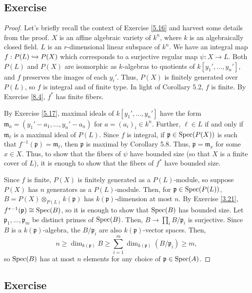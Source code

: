 \subsection{Exercise}\label{8.5}

\begin{proof}
Let's briefly recall the context of Exercise \ref{5.16} and harvest some details from the proof. $X$ is an affine algebraic variety of $k^n$, where
$k$ is an algebraically closed field. $L$ is an $r$-dimensional linear subspace of $k^n$. We have an integral map $f : P(L) \xhookrightarrow{} P(X)$
which corresponds to a surjective regular map $\psi : X \to L$. Both $P(L)$ and $P(X)$ are isomorphic as $k$-algebras to quotients of $k[y_1',\ldots,y_n']$,
and $f$ preserves the images of each $y_i'$. Thus, $P(X)$ is finitely generated over $P(L)$, so $f$ is integral and of finite type. In light of Corollary 5.2, 
$f$ is finite. By Exercise \ref{8.4}, $f^*$ has finite fibers.

By Exercise \ref{5.17}, maximal ideals of $k[y_1',\ldots,y_n']$ have the form $\mathfrak{m}_a = (y_1' - a_1,\ldots,y_n' - a_n)$ for $a = (a_i)_i \in k^n$. 
Further, $\ell \in L$ if and only if $\mathfrak{m}_{\ell}$ is a maximal ideal of $P(L)$. Since $f$ is integral, if $\mathfrak{p} \in \operatorname{Spec}(P(X))$ is such that 
$f^{-1}(\mathfrak{p}) = \mathfrak{m}_{\ell}$, then $\mathfrak{p}$ is maximal by Corollary 5.8. Thus, $\mathfrak{p} = \mathfrak{m}_x$ for some $x \in X$. Thus, 
to show that the fibers of $\psi$ have bounded size (so that $X$ is a finite cover of $L$), it is enough to show that the fibers of $f^*$ have bounded size.

Since $f$ is finite, $P(X)$ is finitely generated as a $P(L)$-module, so suppose $P(X)$ has $n$ generators as a $P(L)$-module. Then, for $\mathfrak{p} \in \operatorname{Spec}(P(L))$,
$B = P(X) \otimes_{P(L)} k(\mathfrak{p})$ has $k(\mathfrak{p})$-dimension at most $n$. By Exercise \ref{3.21}, $f^{*-1}(\mathfrak{p}) \cong \operatorname{Spec}(B)$,
so it is enough to show that $\operatorname{Spec}(B)$ has bounded size. Let $\mathfrak{p}_1,\ldots,\mathfrak{p}_m$ be distinct primes of $\operatorname{Spec}(B)$. Then, $B \to \prod_i B/\mathfrak{p}_i$
is surjective. Since $B$ is a $k(\mathfrak{p})$-algebra, the $B/\mathfrak{p}_i$ are also $k(\mathfrak{p})$-vector spaces. Then,
$$n \ge \dim_{k(\mathfrak{p})} B \ge \sum_{i=1}^m \dim_{k(\mathfrak{p})}(B/\mathfrak{p}_i) \ge m,$$
so $\operatorname{Spec}(B)$ has at most $n$ elements for any choice of $\mathfrak{p} \in \operatorname{Spec}(A)$.
\end{proof}

\subsection{Exercise}\label{8.6}

